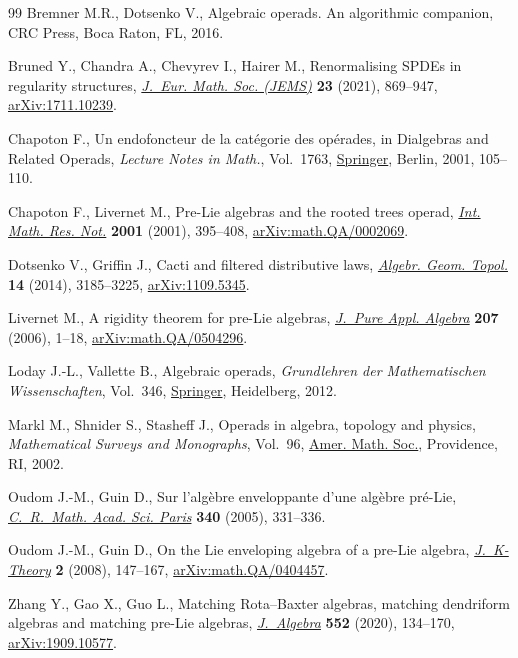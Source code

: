\documentclass[11pt]{article}
\numberwithin{equation}{section}
\numberwithin{equation}{section}
\begin{document}
\begin{thebibliography}{99}
Bremner M.R., Dotsenko V., Algebraic operads. An algorithmic companion, CRC
 Press, Boca Raton, FL, 2016.

Bruned Y., Chandra A., Chevyrev I., Hairer M., Renormalising {SPDE}s in
 regularity structures, \href{https://doi.org/10.4171/jems/1025}{\textit{J.~Eur. Math. Soc. (JEMS)}} \textbf{23} (2021),
 869--947, \href{https://arxiv.org/abs/1711.10239}{arXiv:1711.10239}.

Chapoton F., Un endofoncteur de la cat\'egorie des op\'erades, in Dialgebras
 and Related Operads, \textit{Lecture Notes in Math.}, Vol.~1763, \href{https://doi.org/10.1007/3-540-45328-8_4}{Springer},
 Berlin, 2001, 105--110.

Chapoton F., Livernet M., Pre-{L}ie algebras and the rooted trees operad,
 \href{https://doi.org/10.1155/S1073792801000198}{\textit{Int. Math. Res. Not.}} \textbf{2001} (2001), 395--408,
 \href{https://arxiv.org/abs/math.QA/0002069}{arXiv:math.QA/0002069}.

Dotsenko V., Griffin J., Cacti and filtered distributive laws, \href{https://doi.org/10.2140/agt.2014.14.3185}{\textit{Algebr.
 Geom. Topol.}} \textbf{14} (2014), 3185--3225, \href{https://arxiv.org/abs/1109.5345}{arXiv:1109.5345}.

Livernet M., A rigidity theorem for pre-{L}ie algebras, \href{https://doi.org/10.1016/j.jpaa.2005.10.014}{\textit{J.~Pure Appl.
 Algebra}} \textbf{207} (2006), 1--18, \href{https://arxiv.org/abs/math.QA/0504296}{arXiv:math.QA/0504296}.

Loday J.-L., Vallette B., Algebraic operads, \textit{Grundlehren der
 Mathematischen Wissenschaften}, Vol.~346, \href{https://doi.org/10.1007/978-3-642-30362-3}{Springer}, Heidelberg, 2012.

Markl M., Shnider S., Stasheff J., Operads in algebra, topology and physics,
 \textit{Mathematical Surveys and Monographs}, Vol.~96, \href{https://doi.org/10.1090/surv/096}{Amer. Math. Soc.},
 Providence, RI, 2002.

Oudom J.-M., Guin D., Sur l'alg\`ebre enveloppante d'une alg\`ebre pr\'e-{L}ie,
 \href{https://doi.org/10.1016/j.crma.2005.01.010}{\textit{C.~R.~Math. Acad. Sci. Paris}} \textbf{340} (2005), 331--336.

Oudom J.-M., Guin D., On the {L}ie enveloping algebra of a pre-{L}ie algebra,
 \href{https://doi.org/10.1017/is008001011jkt037}{\textit{J.~K-Theory}} \textbf{2} (2008), 147--167, \href{https://arxiv.org/abs/math.QA/0404457}{arXiv:math.QA/0404457}.

Zhang Y., Gao X., Guo L., Matching {R}ota--{B}axter algebras, matching
 dendriform algebras and matching pre-{L}ie algebras, \href{https://doi.org/10.1016/j.jalgebra.2020.02.011}{\textit{J.~Algebra}}
 \textbf{552} (2020), 134--170, \href{https://arxiv.org/abs/1909.10577}{arXiv:1909.10577}.

\end{thebibliography}
\end{document}
